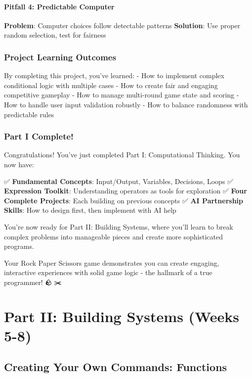 \documentclass[
  letterpaper,
  DIV=11,
  numbers=noendperiod,
  oneside]{scrreprt}
\begin{document}
\subsection{Pitfall 4: Predictable
Computer}\label{pitfall-4-predictable-computer}

\textbf{Problem}: Computer choices follow detectable patterns
\textbf{Solution}: Use proper random selection, test for fairness

\section{Project Learning Outcomes}\label{project-learning-outcomes-3}

By completing this project, you've learned: - How to implement complex
conditional logic with multiple cases - How to create fair and engaging
competitive gameplay - How to manage multi-round game state and scoring
- How to handle user input validation robustly - How to balance
randomness with predictable rules

\section{Part I Complete! 🎉}\label{part-i-complete}

Congratulations! You've just completed Part I: Computational Thinking.
You now have:

✅ \textbf{Fundamental Concepts}: Input/Output, Variables, Decisions,
Loops ✅ \textbf{Expression Toolkit}: Understanding operators as tools
for exploration ✅ \textbf{Four Complete Projects}: Each building on
previous concepts ✅ \textbf{AI Partnership Skills}: How to design
first, then implement with AI help

You're now ready for Part II: Building Systems, where you'll learn to
break complex problems into manageable pieces and create more
sophisticated programs.

Your Rock Paper Scissors game demonstrates you can create engaging,
interactive experiences with solid game logic - the hallmark of a true
programmer! 🪨📄✂️

\part{Part II: Building Systems (Weeks 5-8)}

\chapter{Creating Your Own Commands: Functions}\label{sec-functions}
\end{document}
